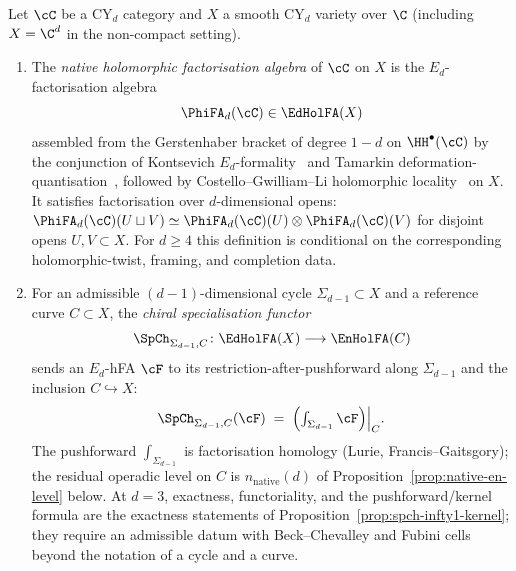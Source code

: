 \begin{definition}
\label{def:phi-fa-and-sp}
Let $\cC$ be a CY$_d$ category and $X$ a smooth CY$_d$ variety over $\C$ (including $X = \C^d$ in the non-compact setting).
\begin{enumerate}[label=\textup{(\roman*)}]
 \item The \emph{native holomorphic factorisation algebra} of $\cC$ on $X$ is the $E_d$-factorisation algebra
 \[
 \PhiFA_d(\cC) \in \EdHolFA(X)
 \]
 assembled from the Gerstenhaber bracket of degree $1 - d$ on $\HH^\bullet(\cC)$ by the conjunction of Kontsevich $E_d$-formality~\cite{Kontsevich1999} and Tamarkin deformation-quantisation~\cite{Tamarkin2007}, followed by Costello--Gwilliam--Li holomorphic locality~\cite{CostelloGwilliam2017,CostelloLi2016,CostelloLi2020} on $X$. It satisfies factorisation over $d$-dimensional opens: $\PhiFA_d(\cC)(U \sqcup V) \simeq \PhiFA_d(\cC)(U) \otimes \PhiFA_d(\cC)(V)$ for disjoint opens $U, V \subset X$. For \(d\geq4\) this definition is conditional on the corresponding holomorphic-twist, framing, and completion data.
 \item For an admissible $(d - 1)$-dimensional cycle $\Sigma_{d - 1} \subset X$ and a reference curve $C \subset X$, the \emph{chiral specialisation functor}
 \[
 \SpCh_{\Sigma_{d-1}, C} \colon \EdHolFA(X) \longrightarrow \EnHolFA(C)
 \]
 sends an $E_d$-hFA $\cF$ to its restriction-after-pushforward along $\Sigma_{d-1}$ and the inclusion $C \hookrightarrow X$:
 \[
 \SpCh_{\Sigma_{d-1}, C}(\cF) \;=\; \Bigl(\textstyle\int_{\Sigma_{d-1}} \cF\Bigr)\Big|_C.
 \]
 The pushforward $\int_{\Sigma_{d - 1}}$ is factorisation homology (Lurie, Francis--Gaitsgory); the residual operadic level on $C$ is $n_{\mathrm{native}}(d)$ of Proposition~\ref{prop:native-en-level} below.
 At $d=3$, exactness, functoriality, and the pushforward/kernel formula
 are the exactness statements of
 Proposition~\ref{prop:spch-infty1-kernel}; they require an admissible
 datum with Beck--Chevalley and Fubini cells beyond the notation of a
 cycle and a curve.
\end{enumerate}
\end{definition}

